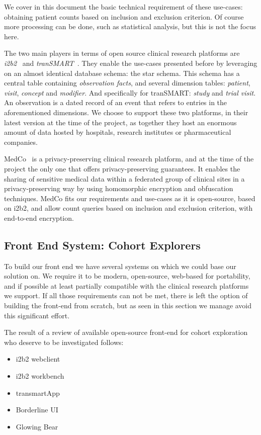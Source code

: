We cover in this document the basic technical requirement of these use-cases: obtaining patient counts based on inclusion and exclusion criterion.
Of course more processing can be done, such as statistical analysis, but this is not the focus here.

The two main players in terms of open source clinical research platforms are \emph{i2b2}~\cite{todo} and \emph{tranSMART}~\cite{todo}.
They enable the use-cases presented before by leveraging on an almost identical database schema: the star schema. 
This schema has a central table containing \emph{observation facts}, and several dimension tables: \emph{patient}, \emph{visit}, \emph{concept} and \emph{modifier}.
And specifically for tranSMART: \emph{study} and \emph{trial visit}.
An observation is a dated record of an event that refers to entries in the aforementioned dimensions.
We choose to support these two platforms, in their latest version at the time of the project, as together they host an enormous amount of data hosted by hospitals, research institutes or pharmaceutical companies.

MedCo~\cite{todo} is a privacy-preserving clinical research platform, and at the time of the project the only one that offers privacy-preserving guarantees.
It enables the sharing of sensitive medical data within a federated group of clinical sites in a privacy-preserving way by using homomorphic encryption and obfuscation techniques.
MedCo fits our requirements and use-cases as it is open-source, based on i2b2, and allow count queries based on inclusion and exclusion criterion, with end-to-end encryption.


\subsection{Front End System: Cohort Explorers}

To build our front end we have several systems on which we could base our solution on.
We require it to be modern, open-source, web-based for portability, and if possible at least partially compatible with the clinical research platforms we support.
If all those requirements can not be met, there is left the option of building the front-end from scratch, but as seen in this section we manage avoid this significant effort.

The result of a review of available open-source front-end for cohort exploration who deserve to be investigated follows:
\begin{itemize}
    \item i2b2 webclient~\cite{todo}
    \item i2b2 workbench~\cite{todo}
    \item transmartApp~\cite{todo}
    \item Borderline UI~\cite{todo}
    \item Glowing Bear~\cite{todo}
\end{itemize}

